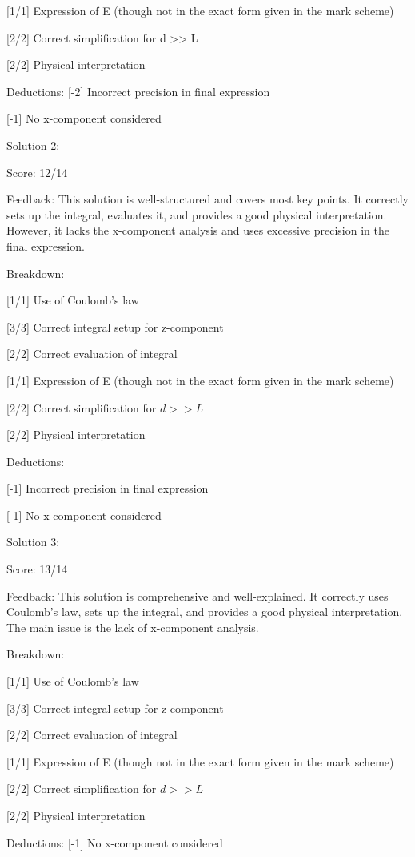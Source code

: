 \documentclass[a4paper,11pt]{article}
\begin{document}
[1/1] Expression of E (though not in the exact form given in the mark scheme)

[2/2] Correct simplification for d >> L

[2/2] Physical interpretation

Deductions:
[-2] Incorrect precision in final expression

[-1] No x-component considered

Solution 2:

Score: 12/14

Feedback: This solution is well-structured and covers most key points. It correctly sets up the integral, evaluates it, and provides a good physical interpretation. However, it lacks the x-component analysis and uses excessive precision in the final expression.

Breakdown:

[1/1] Use of Coulomb's law

[3/3] Correct integral setup for z-component

[2/2] Correct evaluation of integral

[1/1] Expression of E (though not in the exact form given in the mark scheme)

[2/2] Correct simplification for \(d >> L\)

[2/2] Physical interpretation

Deductions:

[-1] Incorrect precision in final expression

[-1] No x-component considered

Solution 3:

Score: 13/14

Feedback: This solution is comprehensive and well-explained. It correctly uses Coulomb's law, sets up the integral, and provides a good physical interpretation. The main issue is the lack of x-component analysis.

Breakdown:

[1/1] Use of Coulomb's law

[3/3] Correct integral setup for z-component

[2/2] Correct evaluation of integral

[1/1] Expression of E (though not in the exact form given in the mark scheme)

[2/2] Correct simplification for \(d >> L\)

[2/2] Physical interpretation

Deductions:
[-1] No x-component considered
\end{document}

